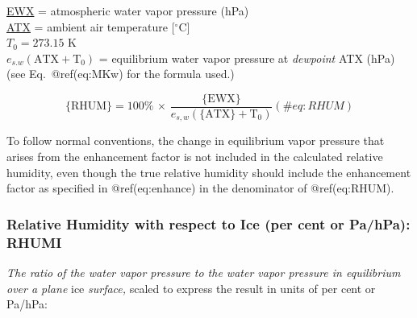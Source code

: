 \documentclass[
  english,
]{book}
\begin{document}
\protect\hyperlink{ewx}{EWX} = atmospheric water vapor pressure (hPa)\\
\protect\hyperlink{ambient-t}{ATX} = ambient air temperature
{[}\(^{\circ}\mathrm{C}\){]}\\
\(T_{0}=273.15\) K\\
\(e_{s.w}(\mathrm{ATX+T_{0}})\) = equilibrium water vapor pressure at
\emph{dewpoint} ATX (hPa)\\
\hspace*{0.333em}\hspace*{0.333em}\hspace*{0.333em}\hspace*{0.333em}\hspace*{0.333em}\hspace*{0.333em}\hspace*{0.333em}\hspace*{0.333em}\hspace*{0.333em}\hspace*{0.333em}(see
Eq.~@ref(eq:MKw) for the formula used.)

\begin{equation}
\mathrm{\{RHUM\}}=100\%\,\times\,\frac{\mathrm{\{EWX\}}}{e_{s,w}(\mathrm{\{ATX\}+T_{0}})}
(\#eq:RHUM)
\end{equation}

To follow normal conventions, the change in equilibrium vapor pressure
that arises from the enhancement factor is not included in the
calculated relative humidity, even though the true relative humidity
should include the enhancement factor as specified in @ref(eq:enhance)
in the denominator of @ref(eq:RHUM).

\hypertarget{rhumi}{%
\subsubsection*{Relative Humidity with respect to Ice (per cent or
Pa/hPa): RHUMI}\label{rhumi}}

\emph{The ratio of the water vapor pressure to the water vapor pressure
in equilibrium over a plane} ice \emph{surface,} scaled to express the
result in units of per cent or Pa/hPa:
\end{document}
